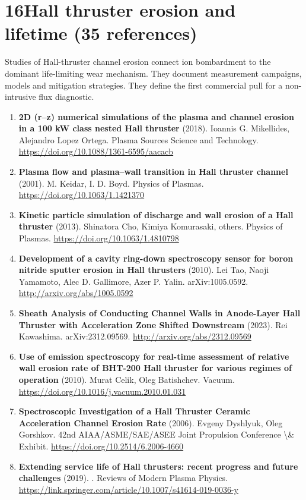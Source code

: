 \documentclass[11pt,a4paper]{article}
\begin{document}
\section*{16\quad Hall thruster erosion and lifetime \textnormal{(\normalsize 35 references)}}
Studies of Hall-thruster channel erosion connect ion bombardment to the dominant life-limiting wear mechanism. They document measurement campaigns, models and mitigation strategies. They define the first commercial pull for a non-intrusive flux diagnostic.
\begin{enumerate}[leftmargin=1.4em]
\item \textbf{2D (r–z) numerical simulations of the plasma and channel erosion in a 100 kW class nested Hall thruster} (2018). Ioannis G. Mikellides, Alejandro Lopez Ortega. Plasma Sources Science and Technology. \url{https://doi.org/10.1088/1361-6595/aacacb}
\item \textbf{Plasma flow and plasma–wall transition in Hall thruster channel} (2001). M. Keidar, I. D. Boyd. Physics of Plasmas. \url{https://doi.org/10.1063/1.1421370}
\item \textbf{Kinetic particle simulation of discharge and wall erosion of a Hall thruster} (2013). Shinatora Cho, Kimiya Komurasaki, others. Physics of Plasmas. \url{https://doi.org/10.1063/1.4810798}
\item \textbf{Development of a cavity ring-down spectroscopy sensor for boron nitride sputter erosion in Hall thrusters} (2010). Lei Tao, Naoji Yamamoto, Alec D. Gallimore, Azer P. Yalin. arXiv:1005.0592. \url{http://arxiv.org/abs/1005.0592}
\item \textbf{Sheath Analysis of Conducting Channel Walls in Anode-Layer Hall Thruster with Acceleration Zone Shifted Downstream} (2023). Rei Kawashima. arXiv:2312.09569. \url{http://arxiv.org/abs/2312.09569}
\item \textbf{Use of emission spectroscopy for real-time assessment of relative wall erosion rate of BHT-200 Hall thruster for various regimes of operation} (2010). Murat Celik, Oleg Batishchev. Vacuum. \url{https://doi.org/10.1016/j.vacuum.2010.01.031}
\item \textbf{Spectroscopic Investigation of a Hall Thruster Ceramic Acceleration Channel Erosion Rate} (2006). Evgeny Dyshlyuk, Oleg Gorshkov. 42nd AIAA/ASME/SAE/ASEE Joint Propulsion Conference \textbackslash{}\& Exhibit. \url{https://doi.org/10.2514/6.2006-4660}
\item \textbf{Extending service life of Hall thrusters: recent progress and future challenges} (2019). . Reviews of Modern Plasma Physics. \url{https://link.springer.com/article/10.1007/s41614-019-0036-y}

\end{enumerate}
\end{document}
